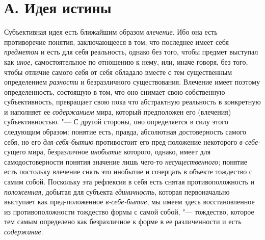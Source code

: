 {{\section[А. Идея истины]{А. Идея истины}
Субъективная идея есть ближайшим образом
{\em влечение}. Ибо она
есть противоречие понятия, заключающееся в том, что последнее имеет себя
{\em предметом} и есть
для себя реальность, однако без того, чтобы предмет выступал как {\em иное},
самостоятельное по отношению к нему, или, иначе говоря, без
того, чтобы отличие самого себя от себя обладало вместе с тем существенным
определением {\em разности}
и безразличного существования. Влечение имеет поэтому
определенность, состоящую в том, что оно снимает свою собственную
субъективность, превращает свою пока что абстрактную реальность в
конкретную и наполняет ее
{\em содержанием} мира,
который предположен его (влечения) субъективностью. "--- С
другой стороны, оно определяется в силу этого следующим образом: понятие
есть, правда, абсолютная достоверность самого себя, но его
{\em для-себя-бытию}
противостоит его пред-положение некоторого
{\em в-себе}{}-сущего
мира, безразличное {\em инобытие}
которого, однако, имеет для самодостоверности понятия
значение лишь чего-то
{\em несущественного};
понятие есть постольку влечение снять это инобытие и
созерцать в объекте тождество с самим собой. Поскольку эта рефлексия в себя
есть снятая противоположность и
{\em положенная}, добытая
для субъекта {\em единичность},
которая первоначально выступает как пред-положенное
{\em в-себе-бытие}, мы
имеем здесь восстановленное из противоположности тождество формы с самой
собой, "--- тождество, которое тем самым
определено как безразличное к форме в ее различенности и
есть {\em содержание}.

}}

